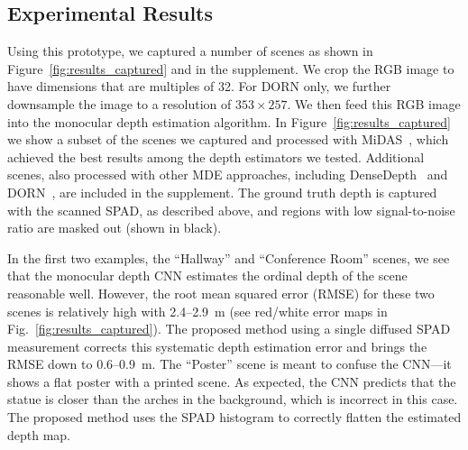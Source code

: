 %

\subsection{Experimental Results}

Using this prototype, we captured a number of scenes as shown in
Figure~\ref{fig:results_captured} and in the supplement. We crop the RGB image
to have dimensions that are multiples of 32. For DORN only, we further
downsample the image to a resolution of $353 \times 257$. We then feed this RGB
image into the monocular depth estimation algorithm. In Figure~\ref{fig:results_captured} we show a subset of the scenes we captured and processed with MiDAS~\cite{Lasinger:2019}, which achieved the best results among the depth estimators we tested. Additional scenes, also processed with other MDE approaches, including DenseDepth~\cite{Alhashim2018} and DORN~\cite{Fu2018}, are included in the supplement. The ground truth depth is captured with the scanned SPAD, as described above, and regions with low signal-to-noise ratio are masked out (shown in black).

In the first two examples, the ``Hallway'' and ``Conference Room'' scenes, we see that the monocular depth CNN estimates the ordinal depth of the scene reasonable well. However, the root mean squared error (RMSE) for these two scenes is relatively high with 2.4--2.9~m (see red/white error maps in Fig.~\ref{fig:results_captured}). The proposed method using a single diffused SPAD measurement corrects this systematic depth estimation error and brings the RMSE down to 0.6--0.9~m. The ``Poster'' scene is meant to confuse the CNN---it shows a flat poster with a printed scene. As expected, the CNN predicts that the statue is closer than the arches in the background, which is incorrect in this case. The proposed method uses the SPAD histogram to correctly flatten the estimated depth map. 

